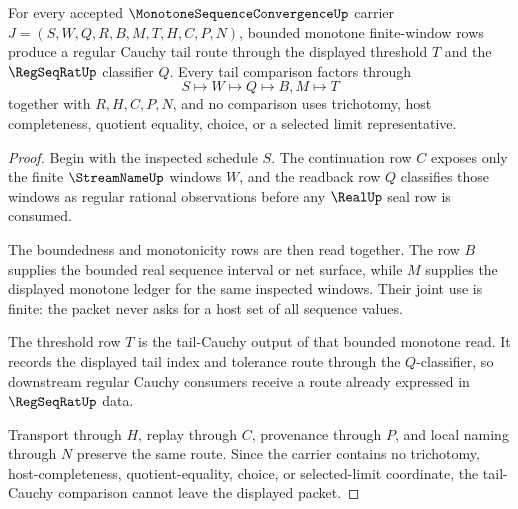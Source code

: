 \begin{theorem}
\label{thm:monotone-sequence-convergence-tail-cauchy}
For every accepted $\MonotoneSequenceConvergenceUp$ carrier $J=(S,W,Q,R,B,M,T,H,C,P,N)$, bounded monotone finite-window rows produce a regular Cauchy tail route through the displayed threshold $T$ and the $\RegSeqRatUp$ classifier $Q$. Every tail comparison factors through
$$
S\longmapsto W\longmapsto Q\longmapsto B,M\longmapsto T
$$
together with $R,H,C,P,N$, and no comparison uses trichotomy, host completeness, quotient equality, choice, or a selected limit representative.
\end{theorem}
\begin{proof}
Begin with the inspected schedule $S$. The continuation row $C$ exposes only the finite $\StreamNameUp$ windows $W$, and the readback row $Q$ classifies those windows as regular rational observations before any $\RealUp$ seal row is consumed.

The boundedness and monotonicity rows are then read together. The row $B$ supplies the bounded real sequence interval or net surface, while $M$ supplies the displayed monotone ledger for the same inspected windows. Their joint use is finite: the packet never asks for a host set of all sequence values.

The threshold row $T$ is the tail-Cauchy output of that bounded monotone read. It records the displayed tail index and tolerance route through the $Q$-classifier, so downstream regular Cauchy consumers receive a route already expressed in $\RegSeqRatUp$ data.

Transport through $H$, replay through $C$, provenance through $P$, and local naming through $N$ preserve the same route. Since the carrier contains no trichotomy, host-completeness, quotient-equality, choice, or selected-limit coordinate, the tail-Cauchy comparison cannot leave the displayed packet.
\end{proof}

